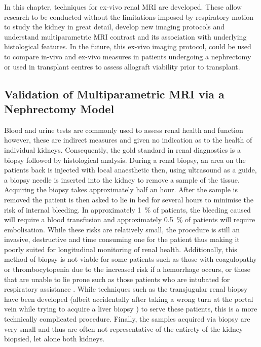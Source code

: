 In this chapter, techniques for ex-vivo renal \ac{MRI} are developed. These allow research to be conducted without the limitations imposed by respiratory motion to study the kidney in great detail, develop new imaging protocols and understand multiparametric \ac{MRI} contrast and its association with underlying histological features. In the future, this ex-vivo imaging protocol, could be used to compare in-vivo and ex-vivo measures in patients undergoing a nephrectomy or used in transplant centres to assess allograft viability prior to transplant.

\subsection{Validation of Multiparametric MRI via a Nephrectomy Model}

Blood and urine tests are commonly used to assess renal health and function however, these are indirect measures and given no indication as to the health of individual kidneys. Consequently, the gold standard in renal diagnostics is a biopsy followed by histological analysis. During a renal biopsy, an area on the patients back is injected with local anaesthetic then, using ultrasound as a guide, a biopsy needle is inserted into the kidney to remove a sample of the tissue. Acquiring the biopsy takes approximately half an hour. After the sample is removed the patient is then asked to lie in bed for several hours to minimise the risk of internal bleeding. In approximately 1~\% of patients, the bleeding caused will require a blood transfusion and approximately 0.5~\% of patients will require embolisation. While these risks are relatively small, the procedure is still an invasive, destructive and time consuming one for the patient thus making it poorly suited for longitudinal monitoring of renal health. Additionally, this method of biopsy is not viable for some patients such as those with coagulopathy or thrombocytopenia due to the increased risk if a hemorrhage occurs, or those that are unable to lie prone such as those patients who are intubated for respiratory assistance \cite{rathod_safety_2017}. While techniques such as the transjugular renal biopsy have been developed (albeit accidentally after taking a wrong turn at the portal vein while trying to acquire a liver biopsy \cite{mal_transjugular_1990}) to serve these patients, this is a more technically complicated procedure. Finally, the samples acquired via biopsy are very small and thus are often not representative of the entirety of the kidney biopsied, let alone both kidneys.

